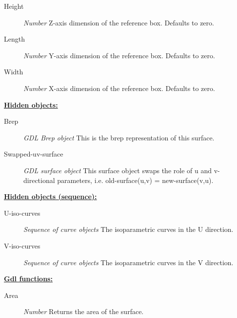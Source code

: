 \documentclass [11pt]{book}
\begin{document}
\begin{itemize}
\begin{description}
\item [Height]
\emph{Number} Z-axis dimension of the reference box. Defaults to zero.


\item [Length]
\emph{Number} Y-axis dimension of the reference box. Defaults to zero.


\item [Width]
\emph{Number} X-axis dimension of the reference box. Defaults to zero.


\end{description}






\textbf{
\underline{Hidden objects:}}

\begin{description}

\item [Brep]
\emph{GDL Brep object} This is the brep representation of this surface.


\item [Swapped-uv-surface]
\emph{GDL surface object} This surface object swaps the role of u and v- directional parameters, i.e. old-surface(u,v) = new-surface(v,u).


\end{description}






\textbf{
\underline{Hidden objects (sequence):}}

\begin{description}

\item [U-iso-curves]
\emph{Sequence of curve objects} The isoparametric curves in the U direction.


\item [V-iso-curves]
\emph{Sequence of curve objects} The isoparametric curves in the V direction.


\end{description}






\textbf{
\underline{Gdl functions:}}

\begin{description}

\item [Area]
\emph{Number} Returns the area of the surface.



\end{description}
\end{itemize}
\end{document}

